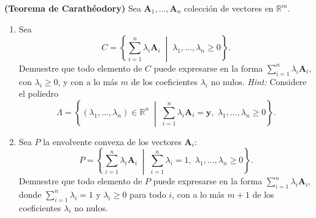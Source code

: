 \textbf{(Teorema de Carathéodory)} Sea $\mathbf{A}_1,\dots,\mathbf{A}_n$ colección de vectores en $\mathbb{R}^m$.

\begin{enumerate}
\item[(a)] Sea
\begin{equation}
C = \left\{ \sum_{i=1}^{n} \lambda_i \mathbf{A}_i \;\middle|\; \lambda_1,\dots,\lambda_n \ge 0 \right\}.
\end{equation}
Demuestre que todo elemento de $C$ puede expresarse en la forma $\sum_{i=1}^{n} \lambda_i \mathbf{A}_i$, con $\lambda_i \ge 0$, y con a lo más $m$ de los coeficientes $\lambda_i$ no nulos. \textit{Hint:} Considere el poliedro
\begin{equation}
\Lambda = \left\{ (\lambda_1,\dots,\lambda_n) \in \mathbb{R}^n \;\middle|\; \sum_{i=1}^{n} \lambda_i \mathbf{A}_i = \mathbf{y},\; \lambda_1,\dots,\lambda_n \ge 0 \right\}.
\end{equation}

\item[(b)] Sea $P$ la envolvente convexa de los vectores $\mathbf{A}_i$:
\begin{equation}
P = \left\{ \sum_{i=1}^{n} \lambda_i \mathbf{A}_i \;\middle|\; \sum_{i=1}^{n} \lambda_i = 1,\; \lambda_1,\dots,\lambda_n \ge 0 \right\}.
\end{equation}
Demuestre que todo elemento de $P$ puede expresarse en la forma $\sum_{i=1}^{n} \lambda_i \mathbf{A}_i$, donde $\sum_{i=1}^{n} \lambda_i = 1$ y $\lambda_i \ge 0$ para todo $i$, con a lo más $m+1$ de los coeficientes $\lambda_i$ no nulos.
\end{enumerate}

